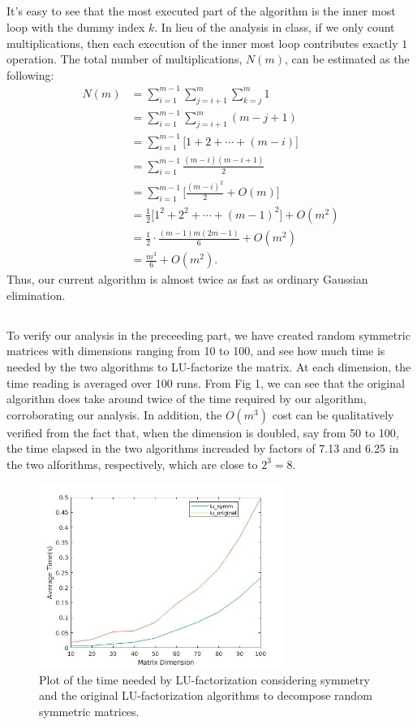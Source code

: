 \documentclass[11pt]{article}
\begin{document}
\subsection{}
It's easy to see that the most executed part of the algorithm is the inner most loop with the dummy index $k$. In lieu of the analysis in class, if we only count multiplications, then each execution of the inner most loop contributes exactly $1$ operation. The total number of multiplications, $N(m)$, can be estimated as the following:
\begin{equation}\begin{split} 
N(m) &= \sum_{i=1}^{m-1} \sum_{j=i+1}^m \sum_{k=j}^m 1\\
&= \sum_{i=1}^{m-1} \sum_{j=i+1}^m (m - j + 1) \\
&= \sum_{i=1}^{m-1} \Big[ 1 + 2 + \cdots + (m-i) \Big] \\
&= \sum_{i=1}^{m-1} \frac{(m-i)(m-i+1)}2 \\
&= \sum_{i=1}^{m-1} \Big[ \frac{(m-i)^2}2 + O(m) \Big]\\
&= \frac12\Big[ 1^2 + 2^2 + \cdots + (m-1)^2 \Big] + O(m^2) \\
&= \frac12\cdot \frac{(m-1)m(2m-1)}6 + O(m^2)\\
&=\frac{m^3}6 + O(m^2).
\end{split}\nonumber\end{equation} 
Thus, our current algorithm is almost twice as fast as ordinary Gaussian elimination.

\subsection{}
To verify our analysis in the preceeding part, we have created random symmetric matrices with dimensions ranging from 10 to 100, and see how much time is needed by the two algorithms to LU-factorize the matrix. At each dimension, the time reading is averaged over 100 runs. From Fig 1, we can see that the original algorithm does take around twice of the time required by our algorithm, corroborating our analysis. In addition, the $O(m^3)$ cost can be qualitatively verified from the fact that, when the dimension is doubled, say from 50 to 100, the time elapsed in the two algorithms increaded by factors of 7.13 and 6.25 in the two alforithms, respectively, which are close to $2^3 = 8$.
\begin{figure}[t]
\includegraphics[width=8cm]{matlab/prob1d.jpg}
\centering
\caption{Plot of the time needed by LU-factorization considering symmetry and the original LU-factorization algorithms to decompose random symmetric matrices.}
\end{figure}
 
\end{document}
